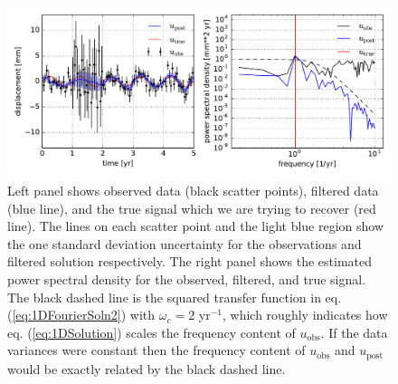 \documentclass[10pt,a4paper]{article}
\begin{document}
\begin{figure}
\includegraphics[scale=0.75]{figures/fig1}
\caption{Left panel shows observed data (black scatter points), filtered data (blue line), and the true signal which we are trying to recover (red line).  The lines on each scatter point and the light blue region show the one standard deviation uncertainty for the observations and filtered solution respectively.  The right panel shows the estimated power spectral density for the observed, filtered, and true signal.  The black dashed line is the squared transfer function in eq. (\ref{eq:1DFourierSoln2}) with $\omega_c=2$ yr$^{-1}$, which roughly indicates how eq. (\ref{eq:1DSolution}) scales the frequency content of $u_\mathrm{obs}$.  If the data variances were constant then the frequency content of $u_\mathrm{obs}$ and $u_\mathrm{post}$ would be exactly related by the black dashed line.}   
\label{fig:Demo}
\end{figure}
\end{document}
